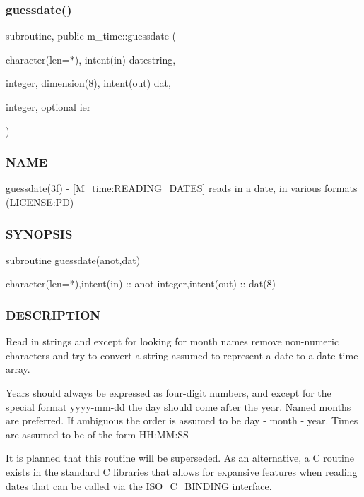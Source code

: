 \subsubsection{\texorpdfstring{guessdate()}{guessdate()}}
{\footnotesize\ttfamily subroutine, public m\+\_\+time\+::guessdate (\begin{DoxyParamCaption}\item[{character(len=$\ast$), intent(in)}]{datestring,  }\item[{integer, dimension(8), intent(out)}]{dat,  }\item[{integer, optional}]{ier }\end{DoxyParamCaption})}



\subsubsection*{N\+A\+ME}

guessdate(3f) -\/ \mbox{[}M\+\_\+time\+:R\+E\+A\+D\+I\+N\+G\+\_\+\+D\+A\+T\+ES\mbox{]} reads in a date, in various formats (L\+I\+C\+E\+N\+SE\+:PD) 

\subsubsection*{S\+Y\+N\+O\+P\+S\+IS}

\begin{DoxyVerb}subroutine guessdate(anot,dat)

 character(len=*),intent(in) :: anot
 integer,intent(out)         :: dat(8)
\end{DoxyVerb}


\subsubsection*{D\+E\+S\+C\+R\+I\+P\+T\+I\+ON}

\begin{DoxyVerb}Read in strings and except for looking for month names remove
non-numeric characters and try to convert a string assumed to represent
a date to a date-time array.

Years should always be expressed as four-digit numbers, and except for
the special format yyyy-mm-dd the day should come after the year. Named
months are preferred. If ambiguous the order is assumed to be day -
month - year. Times are assumed to be of the form HH:MM:SS

It is planned that this routine will be superseded. As an alternative,
a C routine exists in the standard C libraries that allows for
expansive features when reading dates that can be called via the
ISO_C_BINDING interface.
\end{DoxyVerb}


